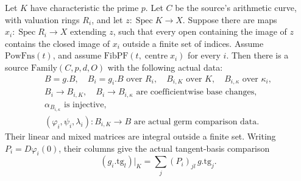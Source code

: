 \begin{srproposition}\label{prop:faithful-actual-family-ex}
Let \(K\) have characteristic the prime \(p\).
Let \(C\) be the source's arithmetic curve, with
valuation rings \(R_i\), and let
\(z:\operatorname{Spec}K\to X\).
Suppose there are maps
\(x_i:\operatorname{Spec}R_i\to X\) extending \(z\),
such that every open containing the image of \(z\)
contains the closed image of \(x_i\) outside a finite
set of indices.
Assume \(\mathrm{PowFns}(t)\), and assume
\(\mathrm{FibPF}(t,\operatorname{centre}x_i)\) for every \(i\).
Then there is a source \(\mathrm{Family}(C,p,d,O)\)
with the following actual data:
\[
 \begin{gathered}
 B=g.B,\quad B_i=g_i.B\text{ over }R_i,\quad
 B_{i,K}\text{ over }K,\quad B_{i,\kappa}\text{ over }\kappa_i,\\
 B_i\longrightarrow B_{i,K},\quad
 B_i\longrightarrow B_{i,\kappa}
             \text{ are coefficientwise base changes},\\
 \alpha_{B_{i,\kappa}}\text{ is injective},\\
 (\varphi_i,\psi_i,\lambda_i):
                          B_{i,K}\longrightarrow B
             \text{ are actual germ comparison data}.
 \end{gathered}
\]
Their linear and mixed matrices are integral outside
a finite set.
Writing \(P_i=D\varphi_i(0)\), their columns give the
actual tangent-basis comparison
\[
       (g_i.\mathrm{tg}_l)|_K
                   =\sum_j(P_i)_{jl}\,g.\mathrm{tg}_j .
 \tag{FF1}\label{eq:faithful-family-tangent-columns}
\]
\end{srproposition}
